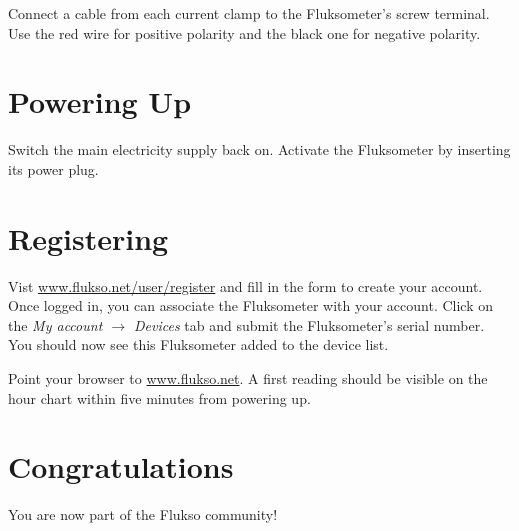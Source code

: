 Connect a cable from each current clamp to the Fluksometer's screw terminal. Use the red wire for positive polarity and the black one for negative polarity. 

\section{Powering Up}

Switch the main electricity supply back on. Activate the Fluksometer by inserting its power plug.

\section{Registering}

Vist \href{http://www.flukso.net/user/register}{www.flukso.net/user/register} and fill in the form to create your account. Once logged in, you can associate the Fluksometer with your account. Click on the \emph{My account $\rightarrow$ Devices} tab and submit the Fluksometer's serial number. You should now see this Fluksometer added to the device list.

Point your browser to \href{http://www.flukso.net}{www.flukso.net}. A first reading should be visible on the hour chart within five minutes from powering up.


\section{Congratulations}

You are now part of the Flukso community!
